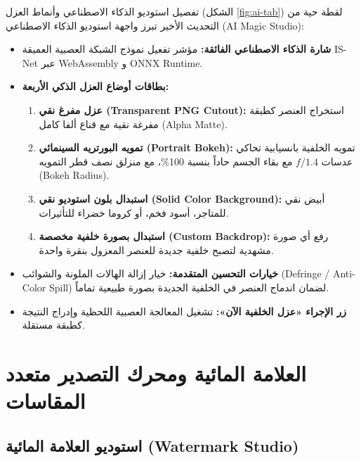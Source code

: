 \documentclass[12pt,a4paper]{report}
\begin{document}
\begin{techbox}{تفصيل استوديو الذكاء الاصطناعي وأنماط العزل (الشكل \ref{fig:ai-tab})}
    لقطة حية من التحديث الأخير تبرز واجهة استوديو الذكاء الاصطناعي (AI Magic Studio):
    \begin{itemize}
        \item \textbf{شارة الذكاء الاصطناعي الفائقة:} مؤشر تفعيل نموذج الشبكة العصبية العميقة IS-Net عبر WebAssembly و ONNX Runtime.
        \item \textbf{بطاقات أوضاع العزل الذكي الأربعة:}
        \begin{enumerate}
            \item \textbf{عزل مفرغ نقي (Transparent PNG Cutout):} استخراج العنصر كطبقة مفرغة نقية مع قناع ألفا كامل (Alpha Matte).
            \item \textbf{تمويه البورتريه السينمائي (Portrait Bokeh):} تمويه الخلفية بانسيابية تحاكي عدسات $f/1.4$ مع بقاء الجسم حاداً بنسبة 100\%، مع منزلق نصف قطر التمويه (Bokeh Radius).
            \item \textbf{استبدال بلون استوديو نقي (Solid Color Background):} أبيض نقي للمتاجر، أسود فخم، أو كروما خضراء للتأثيرات.
            \item \textbf{استبدال بصورة خلفية مخصصة (Custom Backdrop):} رفع أي صورة مشهدية لتصبح خلفية جديدة للعنصر المعزول بنقرة واحدة.
        \end{enumerate}
        \item \textbf{خيارات التحسين المتقدمة:} خيار إزالة الهالات الملونة والشوائب (Defringe / Anti-Color Spill) لضمان اندماج العنصر في الخلفية الجديدة بصورة طبيعية تماماً.
        \item \textbf{زر الإجراء «عزل الخلفية الآن»:} تشغيل المعالجة العصبية اللحظية وإدراج النتيجة كطبقة مستقلة.
    \end{itemize}
\end{techbox}

\chapter{العلامة المائية ومحرك التصدير متعدد المقاسات}

\section{استوديو العلامة المائية (Watermark Studio)}
\end{document}
